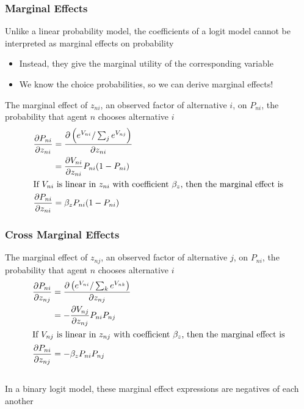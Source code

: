\documentclass{beamer}\usepackage[]{graphicx}\usepackage[]{color}
\begin{document}
\begin{frame}\frametitle{Marginal Effects}
    Unlike a linear probability model, the coefficients of a logit model cannot be interpreted as marginal effects on probability
    \begin{itemize}
    	\item Instead, they give the marginal utility of the corresponding variable
    	\item We know the choice probabilities, so we can derive marginal effects!
    \end{itemize}
    \vspace{2ex}
    The marginal effect of $z_{ni}$, an observed factor of alternative $i$, on $P_{ni}$, the probability that agent $n$ chooses alternative $i$
    \begin{align*}
    	\frac{\partial P_{ni}}{\partial z_{ni}} &= \frac{\partial \left( e^{V_{ni}} / \sum_j e^{V_{nj}} \right)}{\partial z_{ni}} \\
    	&= \frac{\partial V_{ni}}{\partial z_{ni}} P_{ni} (1 - P_{ni}) \\
    	\intertext{If $V_{ni}$ is linear in $z_{ni}$ with coefficient $\beta_z$, then the marginal effect is}
    	\frac{\partial P_{ni}}{\partial z_{ni}} &= \beta_z P_{ni} (1 - P_{ni})
    \end{align*}
\end{frame}

\begin{frame}\frametitle{Cross Marginal Effects}
    The marginal effect of $z_{nj}$, an observed factor of alternative $j$, on $P_{ni}$, the probability that agent $n$ chooses alternative $i$
    \begin{align*}
    	\frac{\partial P_{ni}}{\partial z_{nj}} &= \frac{\partial \left( e^{V_{ni}} / \sum_k e^{V_{nk}} \right)}{\partial z_{nj}} \\
    	&= -\frac{\partial V_{nj}}{\partial z_{nj}} P_{ni} P_{nj} \\
    	\intertext{If $V_{nj}$ is linear in $z_{nj}$ with coefficient $\beta_z$, then the marginal effect is}
    	\frac{\partial P_{ni}}{\partial z_{nj}} &= -\beta_z P_{ni} P_{nj}
    \end{align*} \\
    \vspace{1ex}
    In a binary logit model, these marginal effect expressions are negatives of each another
\end{frame}
\end{document}
